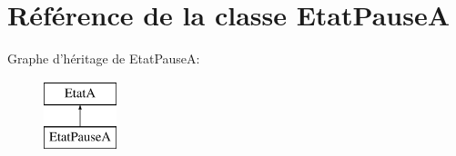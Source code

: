 \hypertarget{classEtatPauseA}{\section{Référence de la classe Etat\+Pause\+A}
\label{classEtatPauseA}
}
Graphe d'héritage de Etat\+Pause\+A\+:\begin{figure}[H]
\begin{center}
\leavevmode
\includegraphics[height=2.000000cm]{classEtatPauseA}
\end{center}
\end{figure}
